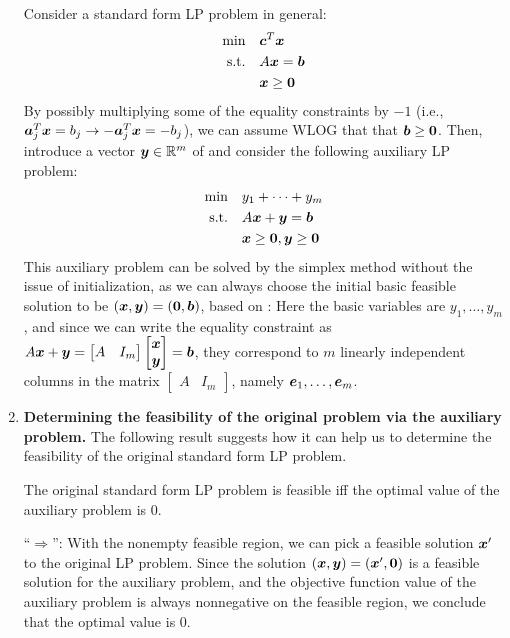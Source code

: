 \begin{enumerate}
Consider a standard form LP problem in general:
\begin{align*}
\text{min}\quad&\bm{c}^{T}\bm{x} \\
\text{s.t.}\quad&A\bm{x}=\bm{b} \\
&\bm{x}\ge \bm{0}
\end{align*}
By possibly multiplying some of the equality constraints by \(-1\) (i.e.,
\(\bm{a}_j^{T}\bm{x}=b_j\to -\bm{a}_j^{T}\bm{x}=-b_j\)), we can assume
WLOG that that \(\bm{b}\ge \bm{0}\). Then, introduce a vector
\(\bm{y}\in\mathbb{R}^m\) of  and consider the following
auxiliary LP problem:
\begin{align*}
\text{min}\quad&y_1+\dotsb+y_m \\
\text{s.t.}\quad&A\bm{x}+\bm{y}=\bm{b} \\
&\bm{x}\ge \bm{0},\bm{y}\ge \bm{0}
\end{align*}
This auxiliary problem can be solved by the simplex method without the issue of
initialization, as we can always choose the initial basic feasible solution to
be \((\bm{x},\bm{y})=(\bm{0},\bm{b})\), based on
: Here the basic variables are \(y_1,\dotsc,y_m\),
and since we can write the equality constraint as
\(A\bm{x}+\bm{y}=\begin{bmatrix}A&I_m\end{bmatrix}\begin{bmatrix}\bm{x}\\\bm{y}\end{bmatrix}=\bm{b}\),
they correspond to \(m\) linearly independent columns in the matrix
\(\begin{bmatrix}A&I_m\end{bmatrix}\), namely \(\bm{e}_1,\dotsc,\bm{e}_m\).

\item \textbf{Determining the feasibility of the original problem via the
auxiliary problem.} The following result suggests how it can help us to
determine the feasibility of the original standard form LP problem.
\begin{proposition}
\label{prp:feasible-iff-aux-optim-zero}
The original standard form LP problem is feasible iff the optimal value of the
auxiliary problem is \(0\).
\end{proposition}
\begin{pf}
``\(\Rightarrow\)'': With the nonempty feasible region, we can pick a feasible
solution \(\bm{x}'\) to the original LP problem. Since the solution
\((\bm{x},\bm{y})=(\bm{x}',\bm{0})\) is a feasible solution for the
auxiliary problem, and the objective function value of the auxiliary problem is
always nonnegative on the feasible region, we conclude that the optimal value
is \(0\).


\end{pf}
\end{enumerate}
